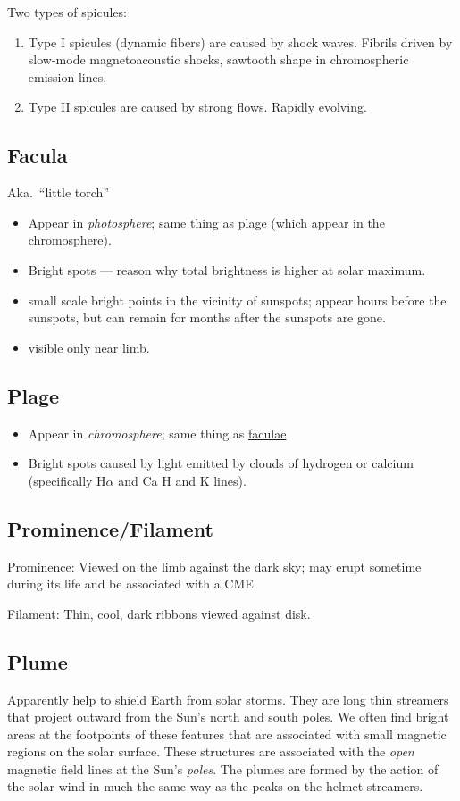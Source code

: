 \documentclass{article}
\begin{document}
Two types of spicules:
\begin{enumerate}
    \item Type I spicules (dynamic fibers) are caused by shock waves.
        Fibrils driven by slow-mode magnetoacoustic shocks, sawtooth shape
        in chromospheric emission lines.
    \item Type II spicules are caused by strong flows. Rapidly evolving.
\end{enumerate}

\subsection{Facula}\label{ssec:facula}
Aka.\ ``little torch''
    \begin{itemize}
        \item Appear in \emph{photosphere}; same thing as plage
            (which appear in the chromosphere).
        \item Bright spots --- reason why total brightness is higher at
            solar maximum.
        \item small scale bright points in the vicinity of sunspots;
            appear hours before the sunspots, but can remain for months
            after the sunspots are gone.
        \item visible only near limb.
    \end{itemize}
\subsection{Plage}
    \begin{itemize}
        \item Appear in \emph{chromosphere}; same thing as \hyperref[ssec:facula]{faculae}
        \item Bright spots caused by light emitted by clouds of
            hydrogen or calcium (specifically H$\alpha$ and
            Ca H and K lines).
    \end{itemize}

\subsection{Prominence/Filament}
Prominence: Viewed on the limb against the dark sky;
may erupt sometime during its life and be associated with a CME.

Filament: Thin, cool, dark ribbons viewed against disk.

\subsection{Plume}
Apparently help to shield Earth from solar storms.
They are long thin streamers that project outward from the Sun's north and
south poles. We often find bright areas at the footpoints of these
features that are associated with small magnetic regions on the solar
surface. These structures are associated with the \emph{open} magnetic
field lines at the Sun's \emph{poles}. The plumes are formed by the action of
the solar wind in much the same way as the peaks on the helmet
streamers.
\end{document}

